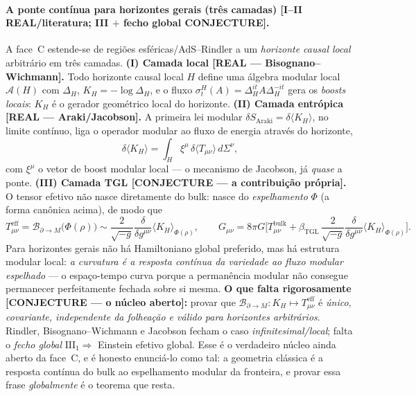 \documentclass[12pt,a4paper]{article}
\newcommand{\betatgl}{\beta_{\text{TGL}}}
\newcommand{\TGL}{\textsc{TGL}}
\begin{document}
\paragraph{A ponte contínua para horizontes gerais (três camadas) \textbf{[I--II REAL/literatura; III $+$ fecho global CONJECTURE]}.} A face~C estende-se de regiões esféricas/AdS--Rindler a um \emph{horizonte causal local} arbitrário em três camadas. \textbf{(I) Camada local [REAL --- Bisognano--Wichmann].} Todo horizonte causal local $H$ define uma álgebra modular local $\mathcal A(H)$ com $\Delta_H$, $K_H=-\log\Delta_H$, e o fluxo $\sigma_t^H(A)=\Delta_H^{it}A\Delta_H^{-it}$ gera os \emph{boosts locais}: $K_H$ é o gerador geométrico local do horizonte. \textbf{(II) Camada entrópica [REAL --- Araki/Jacobson].} A primeira lei modular $\delta S_{\mathrm{Araki}}=\delta\langle K_H\rangle$, no limite contínuo, liga o operador modular ao fluxo de energia através do horizonte,
\begin{equation}\delta\langle K_H\rangle=\int_H \xi^\mu\,\delta\langle T_{\mu\nu}\rangle\,d\Sigma^\nu,\end{equation}com $\xi^\mu$ o vetor de boost modular local --- o mecanismo de Jacobson, já \emph{quase} a ponte. \textbf{(III) Camada \TGL{} [CONJECTURE --- a contribuição própria].} O tensor efetivo não nasce diretamente do bulk: nasce do \emph{espelhamento} $\Phi$ (a forma canônica acima), de modo que
\begin{equation}T^{\mathrm{eff}}_{\mu\nu}=\mathcal B_{\partial\to M}\big(\Phi(\rho)\big)\sim\frac{2}{\sqrt{-g}}\frac{\delta}{\delta g^{\mu\nu}}\langle K_H\rangle_{\Phi(\rho)},\qquad G_{\mu\nu}=8\pi G\Big[T^{\mathrm{bulk}}_{\mu\nu}+\betatgl\,\frac{2}{\sqrt{-g}}\frac{\delta}{\delta g^{\mu\nu}}\langle K_H\rangle_{\Phi(\rho)}\Big].\end{equation}Para horizontes gerais não há Hamiltoniano global preferido, mas há estrutura modular local: \emph{a curvatura é a resposta contínua da variedade ao fluxo modular espelhado} --- o espaço-tempo curva porque a permanência modular não consegue permanecer perfeitamente fechada sobre si mesma. \textbf{O que falta rigorosamente [CONJECTURE --- o núcleo aberto]:} provar que $\mathcal B_{\partial\to M}:K_H\mapsto T^{\mathrm{eff}}_{\mu\nu}$ é \emph{único, covariante, independente da folheação e válido para horizontes arbitrários}. Rindler, Bisognano--Wichmann e Jacobson fecham o caso \emph{infinitesimal/local}; falta o \emph{fecho global} $\mathrm{III}_1\Rightarrow$ Einstein efetivo global. Esse é o verdadeiro núcleo ainda aberto da face~C, e é honesto enunciá-lo como tal: a geometria clássica é a resposta contínua do bulk ao espelhamento modular da fronteira, e provar essa frase \emph{globalmente} é o teorema que resta.
\end{document}
